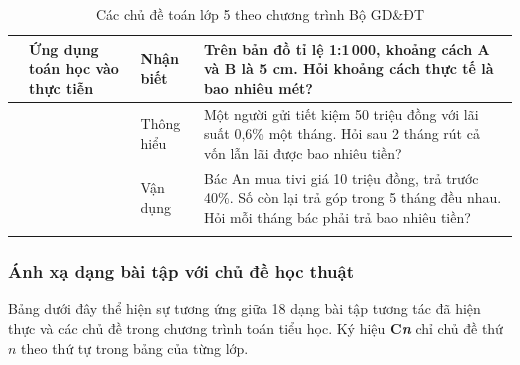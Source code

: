 \begin{longtable}{|>{\centering\arraybackslash}m{0.8cm}|m{3.5cm}|>{\centering\arraybackslash}m{2cm}|m{7.5cm}|}
	10 & Ứng dụng toán học vào thực tiễn
	& Nhận biết & Trên bản đồ tỉ lệ 1:1\,000, khoảng cách A và B là 5 cm. Hỏi khoảng cách thực tế là bao nhiêu mét? \\
	\cline{3-4}
	& & Thông hiểu & Một người gửi tiết kiệm 50 triệu đồng với lãi suất 0,6\% một tháng. Hỏi sau 2 tháng rút cả vốn lẫn lãi được bao nhiêu tiền? \\
	\cline{3-4}
	& & Vận dụng & Bác An mua tivi giá 10 triệu đồng, trả trước 40\%. Số còn lại trả góp trong 5 tháng đều nhau. Hỏi mỗi tháng bác phải trả bao nhiêu tiền? \\
	\hline

	\caption{Các chủ đề toán lớp 5 theo chương trình Bộ GD\&ĐT}
	\label{tab:toan-lop5}
\end{longtable}

\subsubsection{Ánh xạ dạng bài tập với chủ đề học thuật}

Bảng dưới đây thể hiện sự tương ứng giữa 18 dạng bài tập tương tác đã hiện thực và các chủ đề trong chương trình toán tiểu học. Ký hiệu \textbf{C\textit{n}} chỉ chủ đề thứ $n$ theo thứ tự trong bảng của từng lớp.

